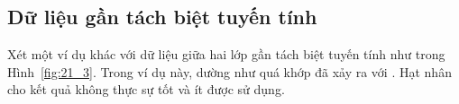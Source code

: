 \subsection{Dữ liệu gần tách biệt tuyến tính}

Xét một ví dụ khác với dữ liệu giữa hai lớp gần tách biệt tuyến tính như trong Hình~\ref{fig:21_3}. Trong ví dụ này, dường như quá khớp đã xảy ra với . Hạt nhân  cho kết quả không thực sự tốt và ít được sử dụng.


